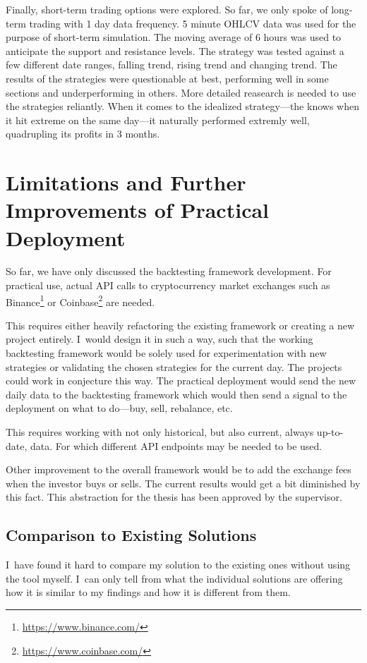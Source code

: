 Finally, short-term trading options were explored. So far, we only spoke of long-term trading with 1 day data frequency. 5 minute OHLCV data was used for the purpose of short-term simulation. The moving average of 6 hours was used to anticipate the support and resistance levels. The strategy was tested against a few different date ranges, falling trend, rising trend and changing trend. The results of the strategies were questionable at best, performing well in some sections and underperforming in others. More detailed reasearch is needed to use the strategies reliantly. When it comes to the idealized strategy---the knows when it hit extreme on the same day---it naturally performed extremly well, quadrupling its profits in 3 months.

\chapter{Limitations and Further Improvements of Practical Deployment}
\label{chapter-limitations-and-improvements}

So far, we have only discussed the backtesting framework development. For practical use, actual API calls to cryptocurrency market exchanges such as Binance\footnote{\url{https://www.binance.com/}} or Coinbase\footnote{\url{https://www.coinbase.com/}} are needed.

This requires either heavily refactoring the existing framework or creating a new project entirely. I~would design it in such a way, such that the working backtesting framework would be solely used for experimentation with new strategies or validating the chosen strategies for the current day. The projects could work in conjecture this way. The practical deployment would send the new daily data to the backtesting framework which would then send a signal to the deployment on what to do---buy, sell, rebalance, etc.

This requires working with not only historical, but also current, always up-to-date, data. For which different API endpoints may be needed to be used.

Other improvement to the overall framework would be to add the exchange fees when the investor buys or sells. The current results would get a bit diminished by this fact. This abstraction for the thesis has been approved by the supervisor.

\section{Comparison to Existing Solutions}
I~have found it hard to compare my solution to the existing ones without using the tool myself. I~can only tell from what the individual solutions are offering how it is similar to my findings and how it is different from them.

